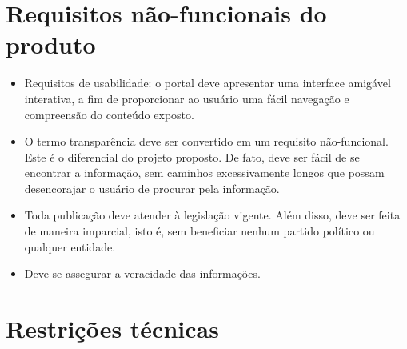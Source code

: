 \documentclass[12pt, a4paper]{article}
\begin{document}
    \section{Requisitos não-funcionais do produto}
    \begin{itemize}
    \item Requisitos de usabilidade: o portal deve apresentar uma interface
        amigável interativa, a fim de proporcionar ao usuário uma fácil
        navegação e compreensão do conteúdo exposto.
    \item O termo transparência deve ser convertido em um requisito
        não-funcional. Este é o diferencial do projeto proposto. De fato, deve
        ser fácil de se encontrar a informação, sem caminhos excessivamente
        longos que possam desencorajar o usuário de procurar pela informação.
    \item Toda publicação deve atender à legislação vigente. Além disso, deve
        ser feita de maneira imparcial, isto é, sem beneficiar nenhum partido
        político ou qualquer entidade.
    \item Deve-se assegurar a veracidade das informações.
    \end{itemize}

    \section{\color{red} Restrições técnicas}
\end{document}
